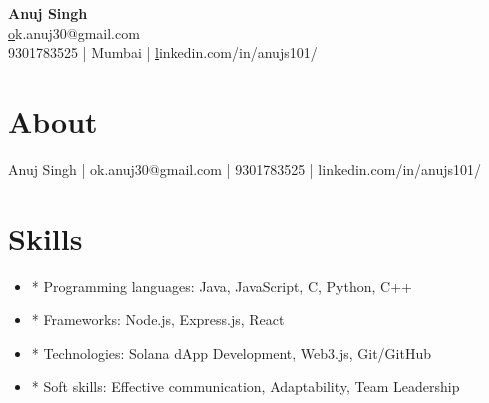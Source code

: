 \documentclass[10pt]{article}
\begin{document}
\begin{center}
    {\Huge \textbf{ Anuj Singh }}\\
    \vspace{0.2cm}
    \href{mailto:ok.anuj30@gmail.com}ok.anuj30@gmail.com \\
    9301783525 | Mumbai | \href{https://linkedin.com/in/anujs101/}linkedin.com/in/anujs101/
\end{center}

\section*{About}
Anuj Singh | ok.anuj30@gmail.com | 9301783525 | linkedin.com/in/anujs101/


\section*{Skills}
\begin{itemize}[leftmargin=*]

  \item * Programming languages: Java, JavaScript, C, Python, C++

  \item * Frameworks: Node.js, Express.js, React

  \item * Technologies: Solana dApp Development, Web3.js, Git/GitHub

  \item * Soft skills: Effective communication, Adaptability, Team Leadership

\end{itemize}
\end{document}
